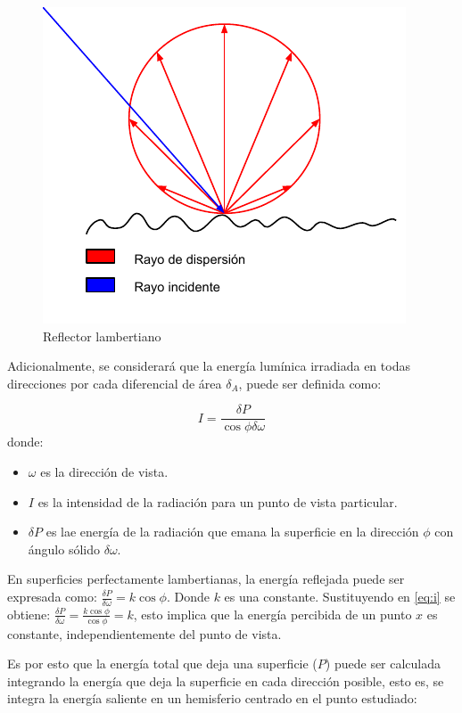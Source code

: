 \vspace{5mm}
\begin{figure}[h]
	\centering
	\includegraphics[width=.6\linewidth]{assets/lambert}
	\caption{Reflector lambertiano}
	\label{img:lamber}
\end{figure}

Adicionalmente, se considerará que la energía lumínica irradiada en todas direcciones por cada diferencial de área $\delta_{A}$, puede ser definida como:

\begin{equation}
    I = \frac{\delta{P}}{\cos{\phi\delta\omega}} \label{eq:i}
\end{equation}
donde:
\begin{itemize}
	\item $\omega$ es la dirección de vista.
    \item $I$ es la intensidad de la radiación para un punto de vista particular.
    \item $\delta{P}$ es lae energía de la radiación que emana la superficie en la dirección $\phi$ con ángulo sólido $\delta\omega$.
\end{itemize}

En superficies perfectamente lambertianas, la energía reflejada puede ser expresada como: $\frac{\delta{P}}{\delta{\omega}} = k\cos{\phi}$. Donde $k$ es una constante.
Sustituyendo en \eqref{eq:i} se obtiene: $\frac{\delta{P}}{\delta{\omega}} = \frac{k\cos{\phi}}{\cos{\phi}} = k$, esto implica que la energía percibida de un punto $x$ 
es constante, independientemente del punto de vista.

Es por esto que la energía total que deja una superficie ($P$) puede ser calculada integrando la energía que deja la superficie en cada dirección posible, esto es, se integra la energía saliente en un hemisferio centrado en el punto estudiado:

